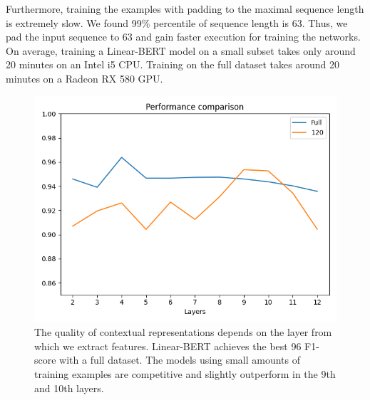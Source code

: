 \documentclass[11pt,a4paper]{article}
\begin{document}
Furthermore, training the examples with padding to the maximal sequence length is extremely slow. We found 99\% percentile of sequence length is 63. Thus, we pad the input sequence to 63 and gain faster execution for training the networks. On average, training a Linear-BERT model on a small subset takes only around 20 minutes on an Intel i5 CPU. Training on the full dataset takes around 20 minutes on a Radeon RX 580 GPU.


\begin{figure}
\begin{center}
  \includegraphics[width=\linewidth]{f1-comp.png}
  \caption{\label{fig:f1-comp}The quality of contextual representations depends on the layer from which we extract features. Linear-BERT achieves the best 96 F1-score with a full dataset. The models using small amounts of training examples are competitive and slightly outperform in the 9th and 10th layers.
}
\end{center}
\end{figure}
\end{document}
